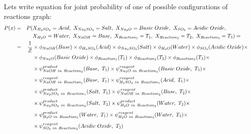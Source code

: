 \documentclass[10pt]{article}
\begin{document}
\begin{tcolorbox}[colback=gray!5,colframe=gray!70,title=Example of factorized chemical reactions graph,left=7pt, right=7pt]
Lets write equation for joint probability of one of possible configurations of reactions graph:
\begin{equation*}
\begin{aligned}
        P(x) & = & P( & X_{H_2SO_4} = Acid,\ X_{Na_2SO_4} = Salt,\ X_{Na_2O} = Basic\ Oxide,\ X_{SO_3} = Acidic\ Oxide, \\
                &    &     & X_{H_2O} = Water,\ X_{NaOH} = Base,\ X_{Reaction_1} = T_1,\ X_{Reaction_2} = T_2,\ X_{Reaction_3} = T_3) = \\
                & = & {1 \over Z} & \times \phi_{NaOH}(Base) \times \phi_{H_2SO_4}(Acid) \times \phi_{Na_2SO_4}(Salt) \times \phi_{H_2O}(Water) \times \phi_{SO_3}(Acidic\ Oxide) \times \\ 
                &    &                   & \times \phi_{Na_2O}(Basic\ Oxide) \times \phi_{Reaction_1}(T_1) \times \phi_{Reaction_2}(T_2) \times \phi_{Reaction_3}(T_3) \times \\[4pt]
                &    &                   & \times \psi^{product}_{NaOH\ in\ Reaction_3}(Base,\ T_3) \times \psi^{reagent}_{Na_2O\ in\ Reaction_3}(Basic\ Oxide,\ T_3) \times \\[4pt]
                &    &                   & \times \psi^{reagent}_{NaOH\ in\ Reaction_1}(Base,\ T_1) \times \psi^{reagent}_{H_2SO_4\ in\ Reaction_1}(Acid,\ T_1) \times  \\[4pt]
                &    &                   & \times \psi^{product}_{Na_2SO_4\ in\ Reaction_1}(Salt,\ T_1) \times \psi^{reagent}_{NaOH\ in\ Reaction_2}(Base,\ T_2) \times \\[4pt]
                &    &                   & \times \psi^{product}_{Na_2SO_4\ in\ Reaction_2}(Salt,\ T_2) \times \psi^{product}_{H_2O\ in\ Reaction_2}(Water,\ T_2) \times \\[4pt]                
                &    &                   & \times \psi^{product}_{H_2O\ in\ Reaction_1}(Water,\ T_1) \times \psi^{reagent}_{H_2O\ in\ Reaction_3}(Water,\ T_3) \times \\[4pt]
                &    &                   & \times  \psi^{reagent}_{SO_3\ in\ Reaction_2}(Acidic\ Oxide,\ T_2) \\
\end{aligned}
\end{equation*}

\end{tcolorbox}

\newpage
\end{document}
